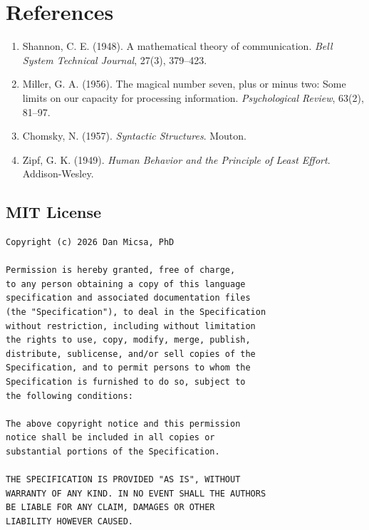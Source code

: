 \documentclass[10pt,twocolumn,letterpaper]{article}
\begin{document}
\section*{References}
\begin{enumerate}
\item Shannon, C. E. (1948). A mathematical theory of communication. \textit{Bell System Technical Journal}, 27(3), 379--423.
\item Miller, G. A. (1956). The magical number seven, plus or minus two: Some limits on our capacity for processing information. \textit{Psychological Review}, 63(2), 81--97.
\item Chomsky, N. (1957). \textit{Syntactic Structures}. Mouton.
\item Zipf, G. K. (1949). \textit{Human Behavior and the Principle of Least Effort}. Addison-Wesley.
\end{enumerate}

\begin{appendices}

\section*{MIT License}

\begin{lstlisting}
Copyright (c) 2026 Dan Micsa, PhD

Permission is hereby granted, free of charge,
to any person obtaining a copy of this language
specification and associated documentation files
(the "Specification"), to deal in the Specification
without restriction, including without limitation
the rights to use, copy, modify, merge, publish,
distribute, sublicense, and/or sell copies of the
Specification, and to permit persons to whom the
Specification is furnished to do so, subject to
the following conditions:

The above copyright notice and this permission
notice shall be included in all copies or
substantial portions of the Specification.

THE SPECIFICATION IS PROVIDED "AS IS", WITHOUT
WARRANTY OF ANY KIND. IN NO EVENT SHALL THE AUTHORS
BE LIABLE FOR ANY CLAIM, DAMAGES OR OTHER
LIABILITY HOWEVER CAUSED.
\end{lstlisting}

\end{appendices}
\end{document}
